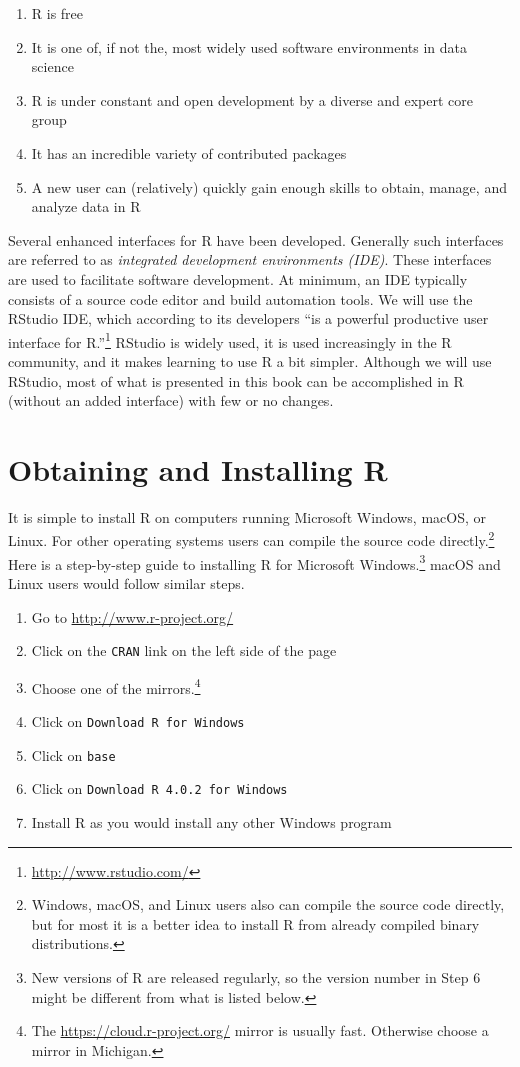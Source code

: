 \documentclass[
]{krantz}
\providecommand{\tightlist}{%
  \setlength{\itemsep}{0pt}\setlength{\parskip}{0pt}}
\begin{document}
\begin{enumerate}
\def\labelenumi{\arabic{enumi}.}
\tightlist
\item
  R is free
\item
  It is one of, if not the, most widely used software environments in data science
\item
  R is under constant and open development by a diverse and expert core group
\item
  It has an incredible variety of contributed packages
\item
  A new user can (relatively) quickly gain enough skills to obtain, manage, and analyze data in R
\end{enumerate}

Several enhanced interfaces for R have been developed. Generally such interfaces are referred to as \emph{integrated development environments (IDE)}. These interfaces are used to facilitate software development. At minimum, an IDE typically consists of a source code editor and build automation tools. We will use the RStudio IDE, which according to its developers ``is a powerful productive user interface for R.''\footnote{\url{http://www.rstudio.com/}} RStudio is widely used, it is used increasingly in the R community, and it makes learning to use R a bit simpler. Although we will use RStudio, most of what is presented in this book can be accomplished in R (without an added interface) with few or no changes.

\hypertarget{obtaining-and-installing-r}{%
\section{Obtaining and Installing R}\label{obtaining-and-installing-r}}

It is simple to install R on computers running Microsoft Windows, macOS, or Linux. For other operating systems users can compile the source code directly.\footnote{Windows, macOS, and Linux users also can compile the source code directly, but for most it is a better idea to install R from already compiled binary distributions.}
Here is a step-by-step guide to installing R for Microsoft Windows.\footnote{New versions of R are released regularly, so the version number in Step 6 might be different from what is listed below.} macOS and Linux users would follow similar steps.

\begin{enumerate}
\def\labelenumi{\arabic{enumi}.}
\tightlist
\item
  Go to \url{http://www.r-project.org/}
\item
  Click on the \texttt{CRAN} link on the left side of the page
\item
  Choose one of the mirrors.\footnote{The \url{https://cloud.r-project.org/} mirror is usually fast. Otherwise choose a mirror in Michigan.}
\item
  Click on \texttt{Download\ R\ for\ Windows}
\item
  Click on \texttt{base}
\item
  Click on \texttt{Download\ R\ 4.0.2\ for\ Windows}
\item
  Install R as you would install any other Windows program
\end{enumerate}
\end{document}
